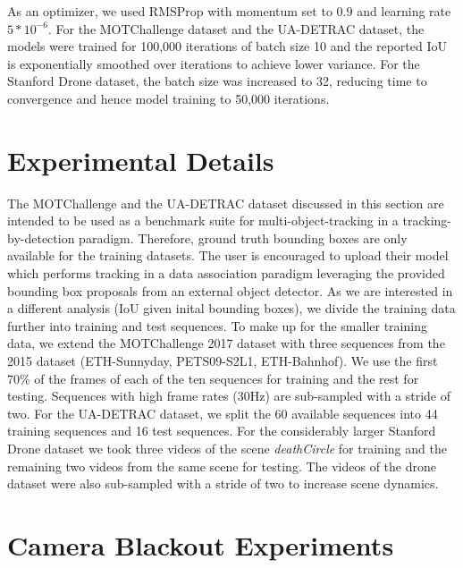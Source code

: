 As an optimizer, we used RMSProp with momentum set to $0.9$ and learning rate $5*10^{-6}$. For the MOTChallenge dataset and the UA-DETRAC dataset, the models were trained for 100,000 iterations of batch size 10 and the reported IoU is exponentially smoothed over iterations to achieve lower variance. For the Stanford Drone dataset, the batch size was increased to 32, reducing time to convergence and hence model training to 50,000 iterations.

\section{Experimental Details}
\label{sec:experimental_details}
The MOTChallenge and the UA-DETRAC dataset discussed in this section are intended to be used as a benchmark suite for multi-object-tracking in a tracking-by-detection paradigm. Therefore, ground truth bounding boxes are only available for the training datasets. The user is encouraged to upload their model which performs tracking in a data association paradigm leveraging the provided bounding box proposals from an external object detector. As we are interested in a different analysis (IoU given inital bounding boxes), we divide the training data further into training and test sequences. To make up for the smaller training data, we extend the MOTChallenge 2017 dataset with three sequences from the 2015 dataset (ETH-Sunnyday, PETS09-S2L1, ETH-Bahnhof). We use the first 70\% of the frames of each of the ten sequences for training and the rest for testing. Sequences with high frame rates (30Hz) are sub-sampled with a stride of two. For the UA-DETRAC dataset, we split the 60 available sequences into 44 training sequences and 16 test sequences. For the considerably larger Stanford Drone dataset we took three videos of the scene \textit{deathCircle} for training and the remaining two videos from the same scene for testing. The videos of the drone dataset were also sub-sampled with a stride of two to increase scene dynamics.


\section{Camera Blackout Experiments}
\label{sec:blackout}

